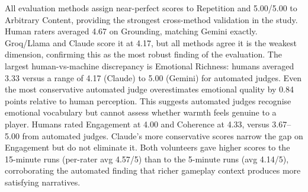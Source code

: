\documentclass{article}
\begin{document}
\begin{table}[htbp]
\centering
\caption{Human ratings for all six Minecraft runs (scale: 1--5), with automated judge averages for comparison.}
\label{tab:human_scores}
\end{table}

All evaluation methods assign near-perfect scores to Repetition and 5.00/5.00 to Arbitrary Content, providing the strongest cross-method validation in the study.
Human raters averaged 4.67 on Grounding, matching Gemini exactly. Groq/Llama and Claude score it at 4.17, but all methods agree it is the weakest dimension, confirming this as the most robust finding of the evaluation.
The largest human-vs-machine discrepancy is Emotional Richness: humans averaged 3.33 versus a range of 4.17 (Claude) to 5.00 (Gemini) for automated judges. Even the most conservative automated judge overestimates emotional quality by 0.84 points relative to human perception. This suggests automated judges recognise emotional vocabulary but cannot assess whether warmth feels genuine to a player.
Humans rated Engagement at 4.00 and Coherence at 4.33, versus 3.67--5.00 from automated judges. Claude's more conservative scores narrow the gap on Engagement but do not eliminate it.
Both volunteers gave higher scores to the 15-minute runs (per-rater avg 4.57/5) than to the 5-minute runs (avg 4.14/5), corroborating the automated finding that richer gameplay context produces more satisfying narratives.
\end{document}
